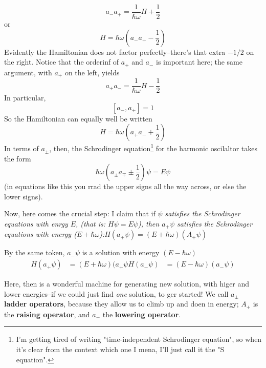 \begin{equation}\label{2.52}
	a_-a_+=\frac{1}{\hbar\omega}H+\frac{1}{2}
\end{equation}
or
\begin{equation}\label{2.53}
	H=\hbar\omega\left(a_-a_+-\frac{1}{2}\right)
\end{equation}
Evidently the Hamiltonian does not factor perfectly--there's that extra $-1/2$ on the right. Notice that the orderinf of $a_+$ and $a_-$ is important here; the same argument, with $a_+$ on the left, yields
\begin{equation}\label{2.54}
	a_+a_-=\frac{1}{\hbar\omega}H-\frac{1}{2}
\end{equation}
In particular,
\begin{equation}\label{2.55}
	[a_-,a_+]=1
\end{equation}
So the Hamiltonian can equally well be written
\begin{equation}\label{2.56}
	H=\hbar\omega\left(a_+a_-+\frac{1}{2}\right)
\end{equation}
In terms of $a_{\pm}$, then, the Schrodinger equation\footnote{I'm getting tired of writing "time-independent Schrodinger equation", so when it's clear from the context which one I mena, I'll just call it the "S equation".} for the harmonic oscilaltor takes the form
\begin{equation}\label{2.57}
	\hbar\omega\left(a_{\pm}a_{\mp}\pm\frac{1}{2}\right)\psi=E\psi
\end{equation}
(in equations like this you rrad the upper signs all the way across, or else the lower signs).

Now, here comes the crucial step: I claim that if \textit{$\psi$ satisfies the Schrodinger equations with enrgy $E$, (that is: $H\psi=E\psi$), then $a_+\psi$ satisfies the Schrodinger equations with energy ($E+\hbar\omega$):$H(a_+\psi)=(E+\hbar\omega)(A_+\psi)$ }

By the same token, $a_-\psi$ is a solution with energy $(E-\hbar\omega)$
\begin{align*}
	H(a_+\psi)&=(E+\hbar\omega)(a_+\psi
	H(a_-\psi)&=(E-\hbar\omega)(a_-\psi)
\end{align*}

Here, then is a wonderful machine for generating new solution, with higer and lower energies--if we could just find \textit{one} solution, to ger started! We call $a_{\pm}$ \textbf{ladder operators}, because they allow us to climb up and doen in energy; $A_+$ is the \textbf{raising operator}, and $a_-$ the \textbf{lowering operator}. 

